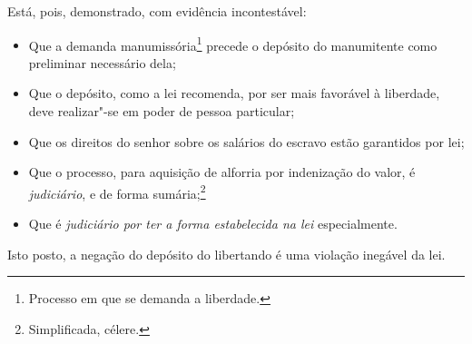 Está, pois, demonstrado, com evidência incontestável:

\begin{itemize}
\item[] Que a demanda
manumissória\footnote{Processo em que se demanda a liberdade.} precede
o depósito do manumitente como preliminar necessário dela;

\item[] Que o depósito, como a lei recomenda, por ser mais favorável à
liberdade, deve realizar"-se em poder de pessoa particular;

\item[] Que os direitos do senhor sobre os salários do escravo estão garantidos
por lei;

\item[] Que o processo, para aquisição de alforria por indenização do valor, é
\emph{judiciário}, e de forma sumária;\footnote{Simplificada, célere.}

\item[] Que é \emph{judiciário por ter a forma estabelecida na lei}
especialmente.

\end{itemize}
Isto posto, a negação do depósito do libertando é uma violação inegável da lei.

